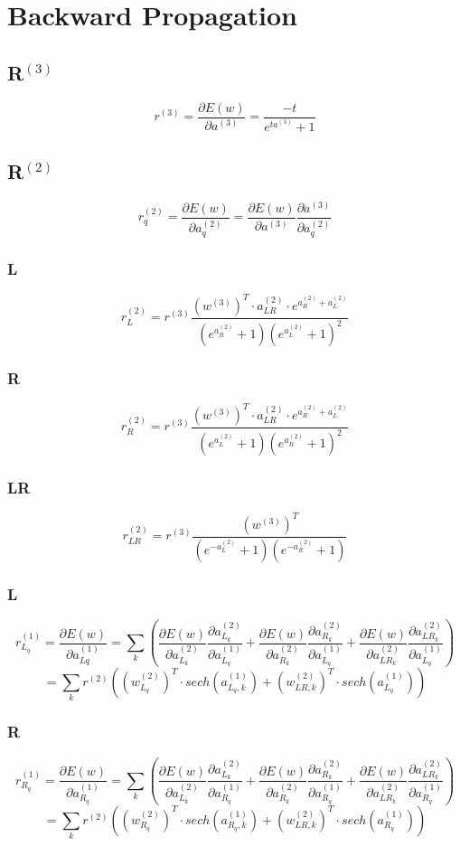 \documentclass[11pt]{article}
\begin{document}
\section*{Backward Propagation}
\subsection*{R$^{(3)}$}
$$r^{(3)}=\frac{\partial E(w)}{\partial a^{(3)}} = \frac{-t}{e^{ta^{(3)}}+1}$$

\subsection*{R$^{(2)}$}
$$ r^{(2)}_{q} = \frac{\partial E(w)}{\partial a^{(2)}_q} = \frac{\partial E(w)}{\partial a^{(3)}}\frac{\partial a^{(3)}}{\partial a^{(2)}_q}  $$
\subsubsection*{L}
$$r^{(2)}_{L} = r^{(3)} \frac{(w^{(3)})^T \cdot a_{LR}^{(2)} \cdot e^{a_R^{(2)}+a_L^{(2)}}}{(e^{a_R^{(2)}}+1)(e^{a_L^{(2)}}+1)^2}$$

\subsubsection*{R}
$$r^{(2)}_{R} =r^{(3)} \frac{(w^{(3)})^T \cdot a_{LR}^{(2)} \cdot e^{a_R^{(2)}+a_L^{(2)}}}{(e^{a_L^{(2)}}+1)(e^{a_R^{(2)}}+1)^2}$$

\subsubsection*{LR}
$$r^{(2)}_{LR} =r^{(3)} \frac{(w^{(3)})^T}{(e^{-a_L^{(2)}}+1)(e^{-a_R^{(2)}}+1)}$$

\subsubsection*{L} 
$$r^{(1)}_{L_q} = \frac{\partial E(w)}{\partial a^{(1)}_{Lq}} =\sum_{k} ( \frac{\partial E(w)}{\partial a^{(2)}_{L_k}} \frac{\partial a^{(2)}_{L_k}}{\partial a^{(1)}_{L_q}} + \frac{\partial E(w)}{\partial a^{(2)}_{R_k}} \frac{\partial a^{(2)}_{R_k}}{\partial a^{(1)}_{L_q}} +  \frac{\partial E(w)}{\partial a^{(2)}_{LR_k}} \frac{\partial a^{(2)}_{LR_k}}{\partial a^{(1)}_{L_q}} )$$
$$= \sum_{k} r^{(2)} ( (w_{L_q}^{(2)})^T\cdot sech(a_{L_q,k}^{(1)}) + (w_{LR,k}^{(2)})^T\cdot sech(a_{L_q}^{(1)}) )$$

\subsubsection*{R}
$$r^{(1)}_{R_q} = \frac{\partial E(w)}{\partial a^{(1)}_{R_q}} =\sum_{k} ( \frac{\partial E(w)}{\partial a^{(2)}_{L_k}} \frac{\partial a^{(2)}_{L_k}}{\partial a^{(1)}_{R_q}} + \frac{\partial E(w)}{\partial a^{(2)}_{R_k}} \frac{\partial a^{(2)}_{R_k}}{\partial a^{(1)}_{R_q}} +  \frac{\partial E(w)}{\partial a^{(2)}_{LR_k}} \frac{\partial a^{(2)}_{LR_k}}{\partial a^{(1)}_{R_q}} )$$
$$=\sum_{k}  r^{(2)} ( (w_{R_q}^{(2)})^T\cdot sech(a_{R_q,k}^{(1)}) + (w_{LR,k}^{(2)})^T\cdot sech(a_{R_q}^{(1)}) )$$
\end{document}
